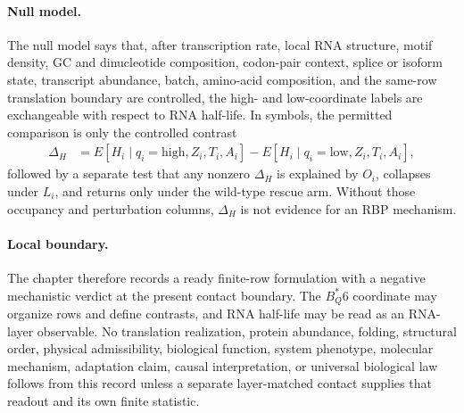 \paragraph{Null model.} The null model says that, after transcription rate, local RNA structure, motif density, GC and dinucleotide composition, codon-pair context, splice or isoform state, transcript abundance, batch, amino-acid composition, and the same-row translation boundary are controlled, the high- and low-coordinate labels are exchangeable with respect to RNA half-life. In symbols, the permitted comparison is only the controlled contrast
$$
\begin{aligned}
  \Delta_H &= E[H_i \mid q_i = \mathrm{high}, Z_i, T_i, A_i] - E[H_i \mid q_i = \mathrm{low}, Z_i, T_i, A_i],
\end{aligned}
$$
followed by a separate test that any nonzero $\Delta_H$ is explained by $O_i$, collapses under $L_i$, and returns only under the wild-type rescue arm. Without those occupancy and perturbation columns, $\Delta_H$ is not evidence for an RBP mechanism.

\paragraph{Local boundary.} The chapter therefore records a ready finite-row formulation with a negative mechanistic verdict at the present contact boundary. The $B^*_Q6$ coordinate may organize rows and define contrasts, and RNA half-life may be read as an RNA-layer observable. No translation realization, protein abundance, folding, structural order, physical admissibility, biological function, system phenotype, molecular mechanism, adaptation claim, causal interpretation, or universal biological law follows from this record unless a separate layer-matched contact supplies that readout and its own finite statistic.